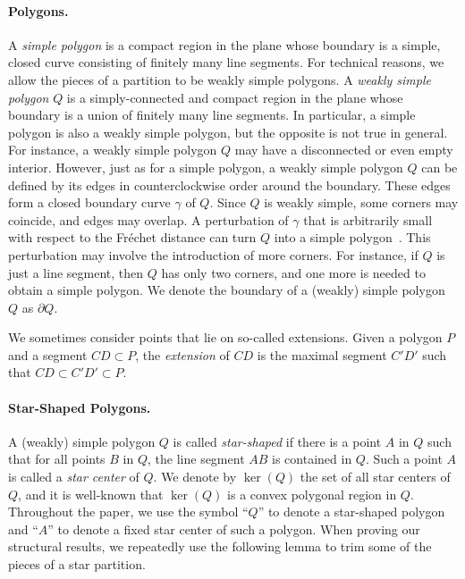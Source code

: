 \documentclass{theoretics}
\begin{document}
\paragraph{Polygons.}
A \emph{simple polygon} is a compact region in the plane whose boundary is a simple, closed curve consisting of finitely many line segments.
For technical reasons, we allow the pieces of a partition to be weakly simple polygons. 
A \emph{weakly simple polygon} $Q$ is a simply-connected and compact region in the plane whose boundary is a union of finitely many line segments.
In particular, a simple polygon is also a weakly simple polygon, but the opposite is not true in general.
For instance, a weakly simple polygon $Q$ may have a disconnected or even empty interior.
However, just as for a simple polygon, a weakly simple polygon $Q$ can be defined by its edges in counterclockwise order around the boundary.
These edges form a closed boundary curve $\gamma$ of $Q$.
Since $Q$ is weakly simple, some corners may coincide, and edges may overlap.
A perturbation of $\gamma$ that is arbitrarily small with respect to the Fréchet distance can turn $Q$ into a simple polygon~\cite{DBLP:journals/dcg/AkitayaAET17,DBLP:conf/soda/ChangEX15}.
This perturbation may involve the introduction of more corners.
For instance, if $Q$ is just a line segment, then $Q$ has only two corners, and one more is needed to obtain a simple polygon.
We denote the boundary of a (weakly) simple polygon $Q$ as $\partial Q$.

We sometimes consider points that lie on so-called extensions.
Given a polygon $P$ and a segment $CD\subset P$, the \emph{extension} of $CD$ is the maximal segment $C'D'$ such that $CD\subset C'D'\subset P$.

\paragraph{Star-Shaped Polygons.}
A (weakly) simple polygon $Q$ is called \emph{star-shaped} if there is a point $A$ in $Q$ such that for all points $B$ in $Q$, the line segment $AB$ is contained in $Q$.
Such a point $A$ is called a \emph{star center} of $Q$.
We denote by $\ker(Q)$ the set of all star centers of $Q$, and it is well-known that $\ker(Q)$ is a convex polygonal region in $Q$.
Throughout the paper, we use the symbol ``$Q$'' to denote a star-shaped polygon and ``$A$'' to denote a fixed star center of such a polygon.
When proving our structural results, we repeatedly use the following lemma to trim some of the pieces of a star partition.
\end{document}
